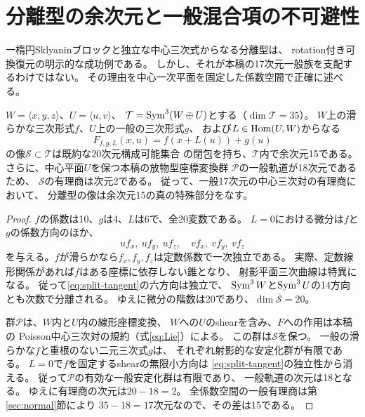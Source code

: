 \section{分離型の余次元と一般混合項の不可避性}
\label{sec:split-codimension}
一楕円Sklyaninブロックと独立な中心三次式からなる分離型は、
rotation付き可換復元の明示的な成功例である。
しかし、それが本稿の17次元一般族を支配するわけではない。
その理由を中心一次平面を固定した係数空間で正確に述べる。

\begin{proposition}[分離型は余次元15]
\label{prop:split-codimension}
$W=\langle x,y,z\rangle$、$U=\langle u,v\rangle$、
$\mathcal T=\operatorname{Sym}^3(W\oplus U)$とする（$\dim\mathcal T=35$）。
$W$上の滑らかな三次形式$f$、$U$上の一般の三次形式$g$、
および$L\in\operatorname{Hom}(U,W)$からなる
\[
 F_{f,g,L}(x,u)=f(x+L(u))+g(u)
 \tag{S}\label{eq:split-family}
\]
の像$\mathcal S\subset\mathcal T$は既約な20次元構成可能集合
の閉包を持ち、$\mathcal T$内で余次元15である。
さらに、中心平面$U$を保つ本稿の放物型座標変換群
$\mathcal P$の一般軌道が18次元であるため、
$\mathcal S$の有理商は次元2である。
従って、一般17次元の中心三次対の有理商において、
分離型の像は余次元15の真の特殊部分をなす。
\end{proposition}
\begin{proof}
$f$の係数は10、$g$は4、$L$は6で、全20変数である。
$L=0$における微分は$f$と$g$の係数方向のほか、
\[
 u f_x,\ u f_y,\ u f_z,\quad
 v f_x,\ v f_y,\ v f_z
 \tag{T}\label{eq:split-tangent}
\]
を与える。$f$が滑らかなら$f_x,f_y,f_z$は定数係数で一次独立である。
実際、定数線形関係があれば$f$はある座標に依存しない錐となり、
射影平面三次曲線は特異になる。
従って\eqref{eq:split-tangent}の六方向は独立で、
$\operatorname{Sym}^3W$と$\operatorname{Sym}^3U$の14方向とも次数で分離される。
ゆえに微分の階数は20であり、$\dim\overline{\mathcal S}=20$。

群$\mathcal P$は、$W$内と$U$内の線形座標変換、
$W$への$U$のshearを含み、$F$への作用は本稿の
Poisson中心三次対の規約（式\eqref{eq:Lie}）による。
この群は$\mathcal S$を保つ。
一般の滑らかな$f$と重根のない二元三次式$g$は、
それぞれ射影的な安定化群が有限である。
$L=0$で$f$を固定するshearの無限小方向は
\eqref{eq:split-tangent}の独立性から消える。
従って$\mathcal P$の有効な一般安定化群は有限であり、
一般軌道の次元は18となる。
ゆえに有理商の次元は$20-18=2$。
全係数空間の一般有理商は第\ref{sec:normal}節により
$35-18=17$次元なので、その差は15である。
\end{proof}


